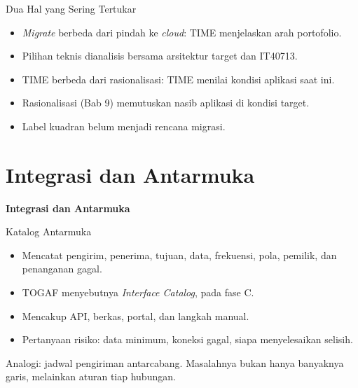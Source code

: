 \documentclass[aspectratio=169, table, 12pt]{beamer}
\begin{document}
\begin{frame}{{\Large Dua Hal yang Sering Tertukar}}
  \vspace{10pt}
  \begin{itemize}
    \item \textit{Migrate} berbeda dari pindah ke \textit{cloud}: TIME menjelaskan arah portofolio.
    \item Pilihan teknis dianalisis bersama arsitektur target dan IT40713.
    \item TIME berbeda dari rasionalisasi: TIME menilai kondisi aplikasi saat ini.
    \item Rasionalisasi (Bab 9) memutuskan nasib aplikasi di kondisi target.
    \item Label kuadran belum menjadi rencana migrasi.
  \end{itemize}
\end{frame}

\section{Integrasi dan Antarmuka}

\begin{frame}{\hfill}
  \centering
  \Huge{\textbf{Integrasi dan Antarmuka}}
\end{frame}

\begin{frame}{{\Large Katalog Antarmuka}}
  \vspace{10pt}
  \begin{itemize}
    \item Mencatat pengirim, penerima, tujuan, data, frekuensi, pola, pemilik, dan penanganan gagal.
    \item TOGAF menyebutnya \textit{Interface Catalog}, pada fase C.
    \item Mencakup API, berkas, portal, dan langkah manual.
    \item Pertanyaan risiko: data minimum, koneksi gagal, siapa menyelesaikan selisih.
  \end{itemize}
  \vspace{6pt}
  {\small Analogi: jadwal pengiriman antarcabang. Masalahnya bukan hanya banyaknya garis, melainkan aturan tiap
  hubungan.}
\end{frame}
\end{document}
